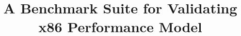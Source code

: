 \documentclass[conference]{IEEEtran}
\begin{document}
\title{A Benchmark Suite for Validating x86 Performance Model\\
}


\maketitle













\vspace{12pt}
\end{document}
